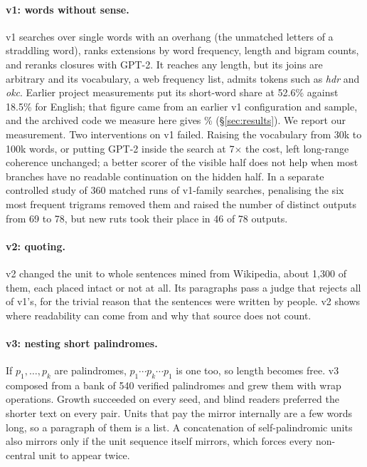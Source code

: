 \documentclass[11pt]{article}
\newcommand{\w}[1]{\emph{#1}}
\begin{document}
\paragraph{v1: words without sense.} v1 searches over single words with an overhang (the unmatched letters of a straddling word), ranks extensions by word frequency, length and bigram counts, and reranks closures with GPT-2. It reaches any length, but its joins are arbitrary and its vocabulary, a web frequency list, admits tokens such as \w{hdr} and \w{okc}. Earlier project measurements put its short-word share at 52.6\% against 18.5\% for English; that figure came from an earlier v1 configuration and sample, and the archived code we measure here gives \vOneShort\% (\S\ref{sec:results}). We report our measurement. Two interventions on v1 failed. Raising the vocabulary from 30k to 100k words, or putting GPT-2 inside the search at 7$\times$ the cost, left long-range coherence unchanged; a better scorer of the visible half does not help when most branches have no readable continuation on the hidden half. In a separate controlled study of 360 matched runs of v1-family searches, penalising the six most frequent trigrams removed them and raised the number of distinct outputs from 69 to 78, but new ruts took their place in 46 of 78 outputs.

\paragraph{v2: quoting.} v2 changed the unit to whole sentences mined from Wikipedia, about 1,300 of them, each placed intact or not at all. Its paragraphs pass a judge that rejects all of v1's, for the trivial reason that the sentences were written by people. v2 shows where readability can come from and why that source does not count.

\paragraph{v3: nesting short palindromes.} If $p_1,\dots,p_k$ are palindromes, $p_1 \cdots p_k \cdots p_1$ is one too, so length becomes free. v3 composed from a bank of 540 verified palindromes and grew them with wrap operations. Growth succeeded on every seed, and blind readers preferred the shorter text on every pair. Units that pay the mirror internally are a few words long, so a paragraph of them is a list. A concatenation of self-palindromic units also mirrors only if the unit sequence itself mirrors, which forces every non-central unit to appear twice.
\end{document}
